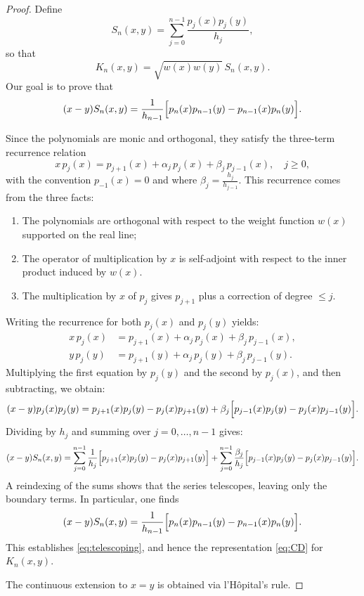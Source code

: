 \documentclass[letterpaper,11pt,oneside,reqno]{article}
\numberwithin{equation}{section}
\theoremstyle{definition}
\begin{document}
\begin{proof}
Define
\[
S_n(x,y)=\sum_{j=0}^{n-1}\frac{p_j(x)p_j(y)}{h_j},
\]
so that
\[
K_n(x,y)=\sqrt{w(x)w(y)}\,S_n(x,y).
\]
Our goal is to prove that
\begin{equation}
\label{eq:telescoping}
(x-y)S_n(x,y)=\frac{1}{h_{n-1}}\Bigl[p_n(x)p_{n-1}(y)-p_{n-1}(x)p_n(y)\Bigr].
\end{equation}

Since the polynomials are monic and orthogonal, they satisfy the three-term recurrence relation
\[
x\,p_j(x)=p_{j+1}(x)+\alpha_j\,p_j(x)+\beta_j\,p_{j-1}(x),\quad j\ge0,
\]
with the convention \(p_{-1}(x)=0\) and where \(\beta_j = \frac{h_j}{h_{j-1}}\).
This recurrence comes from the three facts:
\begin{enumerate}
	\item The polynomials are orthogonal with respect to the weight function \(w(x)\) supported on the real line;
	\item The operator of multiplication by \(x\) is self-adjoint with respect to the inner product induced by \(w(x)\).
	\item The multiplication by $x$ of $p_j$ gives $p_{j+1}$ plus a correction of degree $\le j$.
\end{enumerate}


Writing the recurrence for both \(p_j(x)\) and \(p_j(y)\) yields:
\[
\begin{aligned}
x\,p_j(x)&=p_{j+1}(x)+\alpha_j\,p_j(x)+\beta_j\,p_{j-1}(x),\\[1mm]
y\,p_j(y)&=p_{j+1}(y)+\alpha_j\,p_j(y)+\beta_j\,p_{j-1}(y).
\end{aligned}
\]
Multiplying the first equation by \(p_j(y)\) and the second by \(p_j(x)\), and then subtracting, we obtain:
\[
(x-y)p_j(x)p_j(y)=p_{j+1}(x)p_j(y)-p_j(x)p_{j+1}(y)
+\beta_j\Bigl[p_{j-1}(x)p_j(y)-p_j(x)p_{j-1}(y)\Bigr].
\]
Dividing by \(h_j\) and summing over \(j=0,\ldots,n-1\) gives:
\[
(x-y)S_n(x,y)
=\sum_{j=0}^{n-1}\frac{1}{h_j}\Bigl[p_{j+1}(x)p_j(y)-p_j(x)p_{j+1}(y)\Bigr]
+\sum_{j=0}^{n-1}\frac{\beta_j}{h_j}\Bigl[p_{j-1}(x)p_j(y)-p_j(x)p_{j-1}(y)\Bigr].
\]
A reindexing of the sums shows that the series telescopes, leaving only the boundary terms. In particular, one finds
\[
(x-y)S_n(x,y)=\frac{1}{h_{n-1}}\Bigl[p_n(x)p_{n-1}(y)-p_{n-1}(x)p_n(y)\Bigr].
\]
This establishes \eqref{eq:telescoping}, and hence the representation \eqref{eq:CD} for \(K_n(x,y)\).

The continuous extension to \(x=y\) is obtained via l’Hôpital’s rule.
\end{proof}
\end{document}
